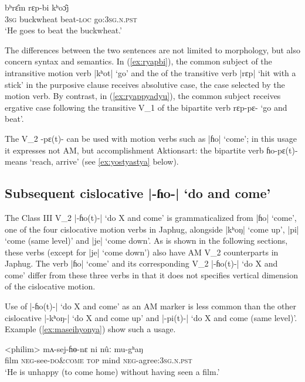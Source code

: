 \documentclass[oneside,a4paper,11pt]{article}
\newcommand{\ipa}[1]{{\phon#1}}
\newcommand{\dhatu}[2]{|\ipa{#1}| `#2'}
\begin{document}
\begin{exe}
\ex \label{ex:ryapbi}
 \gll   \ipa{ʔʌ̄m} \ipa{bʰrɛ̂m} \ipa{rɛp-bi} \ipa{kʰoɔ̂j}   \\
 \textsc{3sg} buckwheat beat-\textsc{loc} go:\textsc{3sg.n.pst} \\
 \glt `He goes to beat the buckwheat.'
    \end{exe}  
   
The differences between the two sentences are not limited to morphology, but also concern syntax and semantics. In  (\ref{ex:ryapbi}), the common subject of the intransitive motion verb \dhatu{kʰot}{go} and the of the transitive verb \dhatu{rɛp}{hit with a stick} in the purposive clause receives absolutive case, the case selected by the motion verb. By contrast, in (\ref{ex:ryappyadyu}), the common subject receives ergative case following the transitive V_1 of the bipartite verb \ipa{rɛp-pɛ-} `go and beat'.

The V_2 \ipa{-pɛ(t)-} can be used with motion verbs such as \dhatu{ɦo}{come}; in this usage it expresses not AM, but accomplishment Aktionsart: the bipartite verb \ipa{ɦo-pɛ(t)-} means `reach, arrive' (see \ref{ex:yostyastya} below).
    
\subsection{Subsequent cislocative \dhatu{-ɦo-}{do and come}} \label{sec:v2.ho}
The Class III V_2 \dhatu{-ɦo(t)-}{do X and come} is grammaticalized from \dhatu{ɦo}{come}, one of the four cislocative motion verbs in Japhug, alongside \dhatu{kʰoŋ}{come up}, \dhatu{pi}{come (same level)} and \dhatu{je}{come down}. As is shown in the following sections, these verbs (except for \dhatu{je}{come down}) also have AM V_2 counterparts in Japhug. The verb \dhatu{ɦo}{come} and its corresponding V_2  \dhatu{-ɦo(t)-}{do X and come} differ from these three verbs in that it does not specifies vertical dimension of the cislocative motion.

Use of \dhatu{-ɦo(t)-}{do X and come} as an AM marker is less common than the other cislocative  \dhatu{-kʰoŋ-}{do X and come up} and \dhatu{-pi(t)-}{do X and come (same level)}. Example (\ref{ex:maseihyonya}) show such a usage.

\begin{exe}
\ex \label{ex:maseihyonya}
 \gll  <philim> \ipa{mʌ-sej-ɦɵ-nɛ} \ipa{ni} \ipa{nûː} \ipa{mu-gʰaŋ} \\
 film \textsc{neg}-see-\textsc{do\&come} \textsc{top} mind \textsc{neg}-agree:\textsc{3sg.n.pst} \\
\glt `He is unhappy (to come home) without having seen a film.'
\end{exe}
\end{document}

